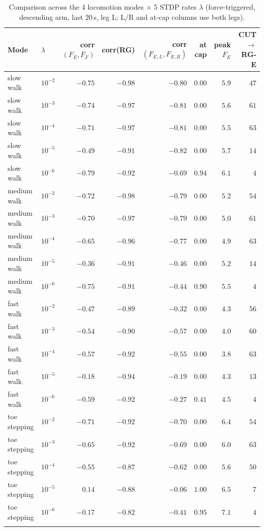 \begin{table}[t]
  \centering
  \footnotesize
  \caption{Comparison across the 4 locomotion modes $\times$ 5 STDP rates $\lambda$ (force-triggered, descending arm, last 20\,s, leg L; L/R and at-cap columns use both legs).}
  \label{tab:mode_lambda}
  \begin{tabular}{ll rrrrrr}
    \toprule
    Mode & $\lambda$ & corr$(F_E,F_F)$ & corr(RG) & corr$(F_{E,L},F_{E,R})$ & at cap & peak $F_E$ & CUT$\to$RG-E \\
    \midrule
    slow walk & $10^{-2}$ & $-0.75$ & $-0.98$ & $-0.80$ & $0.00$ & $5.9$ & $47$ \\
    slow walk & $10^{-3}$ & $-0.74$ & $-0.97$ & $-0.81$ & $0.00$ & $5.6$ & $61$ \\
    slow walk & $10^{-4}$ & $-0.71$ & $-0.97$ & $-0.81$ & $0.00$ & $5.5$ & $63$ \\
    slow walk & $10^{-5}$ & $-0.49$ & $-0.91$ & $-0.82$ & $0.00$ & $5.7$ & $14$ \\
    slow walk & $10^{-6}$ & $-0.79$ & $-0.92$ & $-0.69$ & $0.94$ & $6.1$ & $4$ \\
    \addlinespace[2pt]
    medium walk & $10^{-2}$ & $-0.72$ & $-0.98$ & $-0.79$ & $0.00$ & $5.2$ & $54$ \\
    medium walk & $10^{-3}$ & $-0.70$ & $-0.97$ & $-0.79$ & $0.00$ & $5.0$ & $61$ \\
    medium walk & $10^{-4}$ & $-0.65$ & $-0.96$ & $-0.77$ & $0.00$ & $4.9$ & $63$ \\
    medium walk & $10^{-5}$ & $-0.36$ & $-0.91$ & $-0.46$ & $0.00$ & $5.2$ & $14$ \\
    medium walk & $10^{-6}$ & $-0.75$ & $-0.91$ & $-0.44$ & $0.90$ & $5.5$ & $4$ \\
    \addlinespace[2pt]
    fast walk & $10^{-2}$ & $-0.47$ & $-0.89$ & $-0.32$ & $0.00$ & $4.3$ & $56$ \\
    fast walk & $10^{-3}$ & $-0.54$ & $-0.90$ & $-0.57$ & $0.00$ & $4.0$ & $60$ \\
    fast walk & $10^{-4}$ & $-0.57$ & $-0.92$ & $-0.55$ & $0.00$ & $3.8$ & $63$ \\
    fast walk & $10^{-5}$ & $-0.18$ & $-0.94$ & $-0.19$ & $0.00$ & $4.3$ & $13$ \\
    fast walk & $10^{-6}$ & $-0.59$ & $-0.92$ & $-0.27$ & $0.41$ & $4.5$ & $4$ \\
    \addlinespace[2pt]
    toe stepping & $10^{-2}$ & $-0.71$ & $-0.92$ & $-0.70$ & $0.00$ & $6.4$ & $54$ \\
    toe stepping & $10^{-3}$ & $-0.65$ & $-0.92$ & $-0.69$ & $0.00$ & $6.0$ & $63$ \\
    toe stepping & $10^{-4}$ & $-0.55$ & $-0.87$ & $-0.62$ & $0.00$ & $5.6$ & $50$ \\
    toe stepping & $10^{-5}$ & $0.14$ & $-0.88$ & $-0.06$ & $1.00$ & $6.5$ & $7$ \\
    toe stepping & $10^{-6}$ & $-0.17$ & $-0.82$ & $-0.41$ & $0.95$ & $7.1$ & $4$ \\
    \addlinespace[2pt]
    \bottomrule
  \end{tabular}
\end{table}
